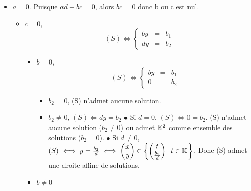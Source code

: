 \documentclass{article}
\begin{document}
\begin{question_kholle}
\begin{itemize}[label=$\bullet$ Supposons]
		\item $a = 0$. Puisque $ad - bc = 0$, alors $bc = 0$ donc b ou c est nul.

		      \begin{itemize}[label=$\bullet$ Si]
			      \item $c = 0$,
			            \begin{equation*}
				            (S) \iff
				            \left\{ \begin{array}{ccc}
					            by & = & b_1 \\
					            dy & = & b_2
				            \end{array} \right.
			            \end{equation*}

			            \begin{itemize}[label=$\bullet$ Si]
				            \item $b = 0$,
				                  \begin{equation*}
					                  (S) \iff
					                  \left\{ \begin{array}{ccc}
						                  by & = & b_1 \\
						                  0  & = & b_2
					                  \end{array} \right.
				                  \end{equation*}
				                  \begin{itemize}[label=$\bullet$ Si]
					                  \item $b_2 = 0$, (S) n'admet aucune solution.
					                  \item $b_2 \neq 0$, $(S) \iff dy = b_2$
					                        \subitem$\bullet$ Si $d = 0$, $(S) \iff 0 = b_2$. (S) n'admet aucune solution ($b_2 \neq 0$) ou admet $\mathbb K^2$ comme ensemble des solutions ($b_2 = 0$).
					                        \subitem$\bullet$ Si $d \neq 0$, $(S) \iff y = \frac{b_2}{d} \iff \begin{pmatrix} x \\ y \end{pmatrix} \in \begin{Bmatrix} \begin{pmatrix} t \\ \frac{b_2}{d} \end{pmatrix} |\; t \in \mathbb K \end{Bmatrix}$. Donc (S) admet une droite affine de solutions.
				                  \end{itemize}
				            \item $b \neq 0$

\end{itemize}
\end{itemize}
\end{itemize}
\end{question_kholle}
\end{document}

